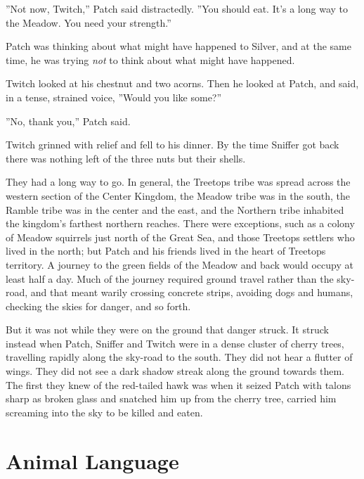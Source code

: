 \documentclass[12pt]{book}
\begin{document}
''Not now, Twitch,'' Patch said distractedly. ''You should eat. It's a long way to the Meadow. You need your strength.''\par
Patch was thinking about what might have happened to Silver, and at the same time, he was trying {\it not} to think about what might have happened.\par
Twitch looked at his chestnut and two acorns. Then he looked at Patch, and said, in a tense, strained voice, ''Would you like some?''\par
''No, thank you,'' Patch said.\par
Twitch grinned with relief and fell to his dinner. By the time Sniffer got back there was nothing left of the three nuts but their shells.\par
 They had a long way to go. In general, the Treetops tribe was spread across the western section of the Center Kingdom, the Meadow tribe was in the south, the Ramble tribe was in the center and the east, and the Northern tribe inhabited the kingdom's farthest northern reaches. There were exceptions, such as a colony of Meadow squirrels just north of the Great Sea, and those Treetops settlers who lived in the north; but Patch and his friends lived in the heart of Treetops territory. A journey to the green fields of the Meadow and back would occupy at least half a day. Much of the journey required ground travel rather than the sky-road, and that meant warily crossing concrete strips, avoiding dogs and humans, checking the skies for danger, and so forth.\par
 But it was not while they were on the ground that danger struck. It struck instead when Patch, Sniffer and Twitch were in a dense cluster of cherry trees, travelling rapidly along the sky-road to the south. They did not hear a flutter of wings. They did not see a dark shadow streak along the ground towards them. The first they knew of the red-tailed hawk was when it seized Patch with talons sharp as broken glass and snatched him up from the cherry tree, carried him screaming into the sky to be killed and eaten.\par

\section{Animal Language}
\end{document}
